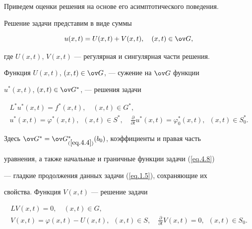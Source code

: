 Приведем оценки решения на основе его асимптотического поведения.


Решение задачи представим в виде суммы


\begin{equation}


\label{eq.4.7}


u(x, t)=U(x, t)+V(x, t), \quad (x, t)\in \ov G,


\end{equation}


где $U(x, t)$, $V(x, t)$ --- регулярная и сингулярная части решения.


Функция $U(x, t)$, $(x, t)\in \ov G$, --- сужение на $\ov G$ функции


$u^*(x, t)$, $(x, t)\in \ov G^*$, --- решения задачи


\begin{equation}


\label{eq.4.8}


\begin{array}{c}


\displaystyle


L^* u^*(x, t)=f^*(x, t), \quad (x, t)\in G^*,\\[2mm]


\displaystyle


u^*(x, t)=\varphi^*(x, t), \ \; (x, t)\in S^*,\quad


\frac{\partial}{\partial t} u^*(x, t)=\varphi^*_0(x, t),\ \; (x, t)\in S^*_0.


\end{array}


\end{equation}


Здесь $\ov G^*=\ov G^*_{(\ref{eq.4.4})}(b_0)$, коэффициенты и правая часть


уравнения, а также начальные и граничные функции задачи (\ref{eq.4.8})


--- гладкие продолжения данных задачи (\ref{eq.1.5}), сохраняющие их


свойства. Функция $V(x, t)$ --- решение задачи


\begin{gather*}


L V(x, t)=0, \quad (x, t)\in G,\\


V(x, t)=\varphi(x, t)-U(x, t), \ \; (x, t)\in S, \quad


\frac{\partial}{\partial t} V(x, t)=0, \ \; (x, t)\in S_0.


\end{gather*}





